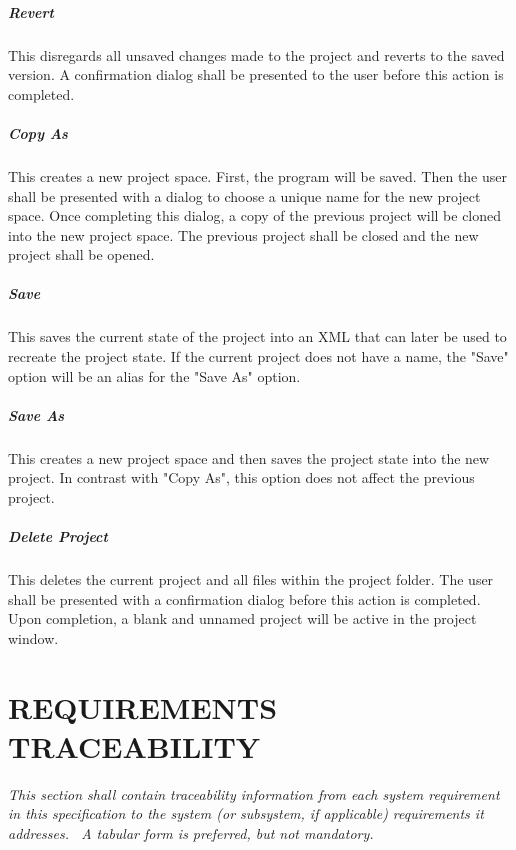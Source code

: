 \documentclass[twoside,letterpaper]{article}
\begin{document}
\subparagraph{Revert}
{
This disregards all unsaved changes made to the project and reverts to the saved version. A confirmation dialog shall be presented to the user before this action is completed.}

\subparagraph{Copy As}
{
This creates a new project space. First, the program will be saved. Then the user shall be presented with a dialog to choose a unique name for the new project space. Once completing this dialog, a copy of the previous project will be cloned into the new project space. The previous project shall be closed and the new project shall be opened.}

\subparagraph{Save}
{
This saves the current state of the project into an XML that can later be used to recreate the project state. If the current project does not have a name, the "Save" option will be an alias for the "Save As" option.}

\subparagraph{Save As}
{
This creates a new project space and then saves the project state into the new project. In contrast with "Copy As", this option does not affect the previous project. }

\subparagraph{Delete Project}
{
This deletes the current project and all files within the project folder. The user shall be presented with a confirmation dialog before this action is completed. Upon completion, a blank and unnamed project will be active in the project window. }









\clearpage\setcounter{page}{1}\pagestyle{Convertvi}
\section[REQUIREMENTS TRACEABILITY]{\rmfamily\bfseries
REQUIREMENTS TRACEABILITY}
{\itshape
This section shall contain traceability information from each system
requirement in this specification to the system (or subsystem, if
applicable) requirements it addresses. \ A tabular form is preferred,
but not mandatory.}


\bigskip
\end{document}
